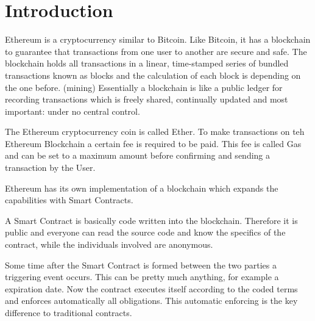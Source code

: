 \chapter{Introduction}\label{chap:intro}
\chapterstart

Ethereum is a cryptocurrency similar to Bitcoin. Like Bitcoin, it has a blockchain to guarantee that transactions from one user to another are secure and safe.
The blockchain holds all transactions in a linear, time-stamped series of bundled transactions known as blocks and the calculation of each block is depending on the one before. (mining)
Essentially a blockchain is like a public ledger for recording transactions which is freely shared, continually updated and most important: under no central control.

The Ethereum cryptocurrency coin is called Ether. To make transactions on teh Ethereum Blockchain a certain fee is required to be paid. This fee is called Gas and can be set to a maximum amount before confirming and sending a transaction by the User.

Ethereum has its own implementation of a blockchain which expands the capabilities with Smart Contracts.

A Smart Contract is basically code written into the blockchain. Therefore it is public and everyone can read the source code and know the specifics of the contract, while the individuals involved are anonymous.

Some time after the Smart Contract is formed between the two parties a triggering event occurs. This can be pretty much anything, for example a expiration date. Now the contract executes itself according to the coded terms and enforces automatically all obligations. This automatic enforcing is the key difference to traditional contracts.


\chapterend

